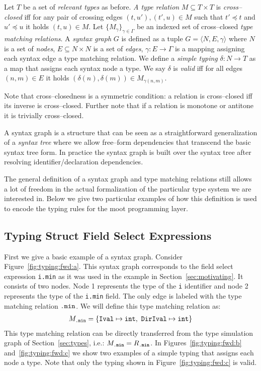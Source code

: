 \documentclass{sigplanconf}
\newcommand{\concept}[1]{\emph{#1}}
\newcommand{\mt}[1]{\text{\tt #1}}
\begin{document}
\begin{definition}\label{def:syntax_graphs}
Let $T$ be a set of \emph{relevant types} as before. \emph{A type
  relation} $M \subseteq T \times T$ is \emph{cross--closed} iff for
any pair of crossing edges $(t, u'), (t', u) \in M$ such that $t'
\preceq t$ and $u' \preceq u$ it holds $(t, u) \in M$. Let
$\{M_\gamma\}_{\gamma \in \Gamma}$ be an indexed set of cross--closed
\emph{type matching relations}.
A \concept{syntax graph} $G$ is
defined as a tuple $G = \langle N, E, \gamma \rangle$ where $N$ is a
set of \concept{nodes}, $E \subseteq N \times N$ is a set of
\concept{edges}, $\gamma : E \to \Gamma$ is a mapping assigning each
syntax edge a type matching relation. We define a \concept{simple
  typing} $\delta : N \to T$ as a map that assigns each syntax node a
type. We say $\delta$ is \emph{valid} iff for all edges $(n, m) \in E$
it holds $(\delta(n), \delta(m)) \in M_{\gamma(n, m)}$.
\end{definition}

Note that cross--closedness is a symmetric condition: a relation is
cross--closed iff its inverse is cross--closed. Further note that if a
relation is monotone or antitone it is trivially cross--closed.

A syntax graph is a structure that can be seen as a straightforward
generalization of a \concept{syntax tree} where we allow free--form
dependencies that transcend the basic syntax tree form. In practice
the syntax graph is built over the syntax tree after resolving
identifier/declaration dependencies.

The general definition of a syntax graph and type matching relations
still allows a lot of freedom in the actual formalization of the
particular type system we are interested in. Below we give two
particular examples of how this definition is used to encode the
typing rules for the {\sc moot} programming layer.

\subsection{Typing Struct Field Select Expressions}

First we give a basic example of a syntax graph. Consider
Figure~\ref{fig:typing:fwd:a}. This syntax graph corresponds to the
field select expression \verb+i.min+ as it was used in the example in
Section~\ref{sec:motivating}. It consists of two nodes. Node 1
represents the type of the \verb+i+ identifier and node 2 represents
the type of the \verb+i.min+ field. The only edge is labeled with the
type matching relation $\mt{.min}$. We will define this type matching
relation as:
\begin{align*}
M_\mt{.min} = \{ \mt{Ival} \mapsto \mt{int},\ \mt{DirIval} \mapsto
\mt{int} \}
\end{align*}
This type matching relation can be directly transferred from the type
simulation graph of Section~\ref{sec:types}, i.e.: $M_\mt{.min} =
R_\mt{.min}$.
In Figures~\ref{fig:typing:fwd:b} and~\ref{fig:typing:fwd:c} we show two
examples of a simple typing that assigns each node a type. Note that
only the typing shown in Figure~\ref{fig:typing:fwd:c} is valid.
\end{document}

